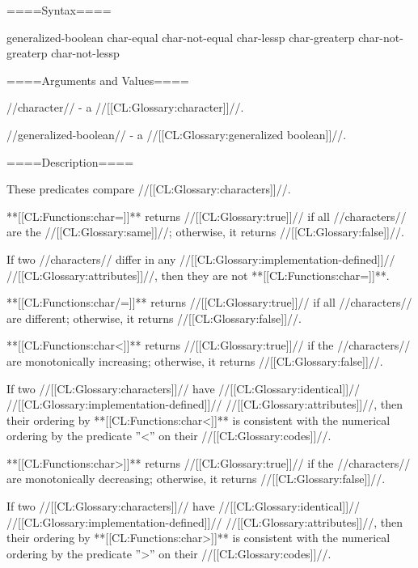 
====Syntax====

 {generalized-boolean} {      \noalign{\vskip 5pt} char-equal char-not-equal char-lessp char-greaterp char-not-greaterp char-not-lessp}

====Arguments and Values====

//character// - a //[[CL:Glossary:character]]//.

//generalized-boolean// - a //[[CL:Glossary:generalized boolean]]//.

====Description====

These predicates compare //[[CL:Glossary:characters]]//.

**[[CL:Functions:char=]]** returns //[[CL:Glossary:true]]// if all //characters// are the //[[CL:Glossary:same]]//; otherwise, it returns //[[CL:Glossary:false]]//.

If two //characters// differ in any //[[CL:Glossary:implementation-defined]]// //[[CL:Glossary:attributes]]//, then they are not **[[CL:Functions:char=]]**.

**[[CL:Functions:char/=]]** returns //[[CL:Glossary:true]]// if all //characters// are different; otherwise, it returns //[[CL:Glossary:false]]//.

**[[CL:Functions:char<]]** returns //[[CL:Glossary:true]]// if the //characters// are monotonically increasing; otherwise, it returns //[[CL:Glossary:false]]//.

If two //[[CL:Glossary:characters]]// have //[[CL:Glossary:identical]]// //[[CL:Glossary:implementation-defined]]// //[[CL:Glossary:attributes]]//, then their ordering by **[[CL:Functions:char<]]** is consistent with the numerical ordering by the predicate ''<'' on their //[[CL:Glossary:codes]]//.

**[[CL:Functions:char>]]** returns //[[CL:Glossary:true]]// if the //characters// are monotonically decreasing; otherwise, it returns //[[CL:Glossary:false]]//.

If two //[[CL:Glossary:characters]]// have //[[CL:Glossary:identical]]// //[[CL:Glossary:implementation-defined]]// //[[CL:Glossary:attributes]]//, then their ordering by **[[CL:Functions:char>]]** is consistent with the numerical ordering by the predicate ''>'' on their //[[CL:Glossary:codes]]//.

